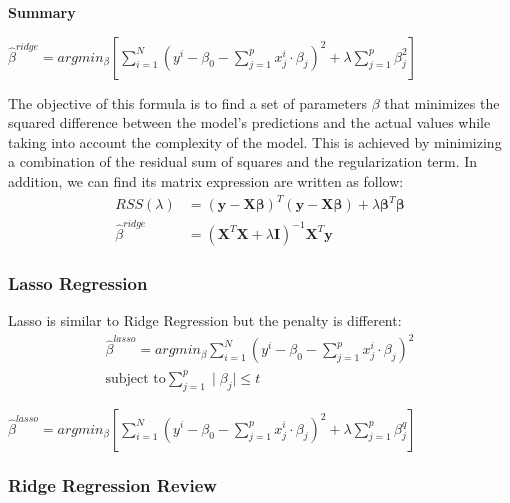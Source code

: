 \documentclass{article}
\begin{document}
\textbf{Summary}
\begin{tcolorbox}[colback=yellow!20, colframe=yellow!90, title=Ridge Regression, coltitle=black]
$ \hat{\beta}^{ridge} = argmin_{\beta}\left[ \sum_{i=1}^{N}\left(y^{i}-\beta_{0}-\sum_{j=1}^{p}x_{j}^{i} \cdot \beta_{j}\right)^{2} + \lambda \sum_{j=1}^{p}\beta_{j}^{2}\right]$
\end{tcolorbox}
The objective of this formula is to find a set of parameters \( \beta \) that minimizes the squared difference between the model's predictions and the actual values while taking into account the complexity of the model. This is achieved by minimizing a combination of the residual sum of squares and the regularization term. In addition, we can find its matrix expression are written as follow:
\begin{align*}
    RSS(\lambda) &= \left(\bm{y} - \bm{X}\bm{\beta} \right)^{T} \left(\bm{y} - \bm{X}\bm{\beta} \right) + \lambda \bm{\beta}^{T}\bm{\beta}\\
    \hat{\beta}^{ridge} &= \left(\bm{X}^{T}\bm{X} + \lambda\bm{I} \right)^{-1}\bm{X}^{T}\bm{y}
\end{align*}

\subsubsection{Lasso Regression}
Lasso is similar to Ridge Regression but the penalty is different:
\begin{align*}
     \hat{\beta}^{lasso} = argmin_{\beta}\sum_{i=1}^{N}\left(y^{i}-\beta_{0}-\sum_{j=1}^{p}x_{j}^{i} \cdot \beta_{j}\right)^{2}\\
    \text{subject to} \sum_{j=1}^{p} \mid \beta_{j} \mid \leq t
\end{align*}
\begin{tcolorbox}[colback=yellow!20, colframe=yellow!90, title=Lasso Regression, coltitle=black]
$ \hat{\beta}^{lasso} = argmin_{\beta}\left[ \sum_{i=1}^{N}\left(y^{i}-\beta_{0}-\sum_{j=1}^{p}x_{j}^{i} \cdot \beta_{j}\right)^{2} + \lambda \sum_{j=1}^{p}\beta_{j}^{q}\right]$
\end{tcolorbox}

\subsubsection{Ridge Regression Review}
\end{document}
